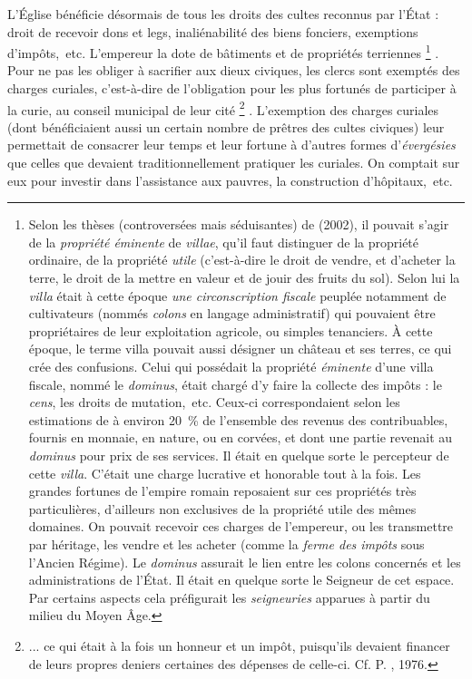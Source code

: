  L'Église bénéficie désormais de tous les droits des cultes reconnus par l'État : droit de recevoir dons et legs, inaliénabilité des biens fonciers, exemptions d'impôts,~etc. L'empereur la dote de bâtiments et de propriétés terriennes%
\footnote{Selon les thèses (controversées mais séduisantes) de  (2002), il pouvait s'agir de la \emph{propriété éminente} de \emph{villae}, qu'il faut distinguer de la propriété ordinaire, de la propriété \emph{utile} (c'est-à-dire le droit de vendre, et d'acheter la terre, le droit de la mettre en valeur et de jouir des fruits du sol). Selon lui la \emph{villa} était à cette époque \emph{une circonscription fiscale} peuplée notamment de cultivateurs (nommés \emph{colons} en langage administratif) qui pouvaient être propriétaires de leur exploitation agricole, ou simples tenanciers. À cette époque, le terme villa pouvait aussi désigner un château et ses terres, ce qui crée des confusions. Celui qui possédait la propriété \emph{éminente} d'une villa fiscale, nommé le \emph{dominus}, était chargé d'y faire la collecte des impôts : le \emph{cens}, les droits de mutation,~etc. Ceux-ci correspondaient selon les estimations de  à environ 20~\% de l'ensemble des revenus des contribuables, fournis en monnaie, en nature, ou en corvées, et dont une partie revenait au \emph{dominus} pour prix de ses services. Il était en quelque sorte le percepteur de cette \emph{villa}. C'était une charge lucrative et honorable tout à la fois. Les grandes fortunes de l'empire romain reposaient sur ces propriétés très particulières, d'ailleurs non exclusives de la propriété utile des mêmes domaines. On pouvait recevoir ces charges de l'empereur, ou les transmettre par héritage, les vendre et les acheter (comme la \emph{ferme des impôts} sous l'Ancien Régime). Le \emph{dominus} assurait le lien entre les colons concernés et les administrations de l'État. Il était en quelque sorte le Seigneur de cet espace. Par certains aspects cela préfigurait les \emph{seigneuries} apparues à partir du milieu du Moyen Âge.}%
. Pour ne pas les obliger à sacrifier aux dieux civiques, les clercs sont exemptés des charges curiales, c'est-à-dire de l'obligation pour les plus fortunés de participer à la curie, au conseil municipal de leur cité%
\footnote{... ce qui était à la fois un honneur et un impôt, puisqu'ils devaient financer de leurs propres deniers certaines des dépenses de celle-ci. Cf. P. , 1976.} 
. L'exemption des charges curiales (dont bénéficiaient aussi un certain nombre de prêtres des cultes civiques) leur permettait de consacrer leur temps et leur fortune à d'autres formes d'\emph{évergésies} que celles que devaient traditionnellement pratiquer les curiales. On comptait sur eux pour investir dans l'assistance aux pauvres, la construction d'hôpitaux,~etc. 

